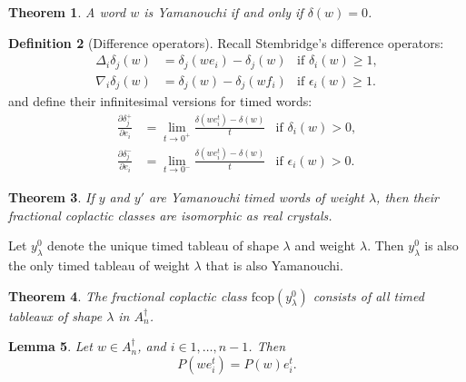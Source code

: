 \documentclass[12pt]{amsproc}
\newcommand{\fcop}{\mathrm{fcop}}
\newtheorem{theorem}{Theorem}
\newtheorem{lemma}[theorem]{Lemma}
\theoremstyle{definition}
\newtheorem{definition}[theorem]{Definition}
\begin{document}
\begin{theorem}
  A word $w$ is Yamanouchi if and only if $\delta(w)=0$.
\end{theorem}
\begin{definition}
  [Difference operators]
  Recall Stembridge's difference operators:
  \begin{align*}
    \Delta_i\delta_j(w) & = \delta_j(we_i)-\delta_j(w) & \text{if } \delta_i(w)\geq 1,\\
    \nabla_i\delta_j(w) & = \delta_j(w)-\delta_j(wf_i) & \text{if } \epsilon_i(w)\geq 1.
  \end{align*}
  and define their infinitesimal versions for timed words:
  \begin{align*}
    \frac{\partial\delta_j^+}{\partial e_i} &= \lim_{t\to 0^+}\frac{\delta(we_i^t)-\delta(w)}t & \text{if } \delta_i(w)>0,\\
    \frac{\partial\delta_j^-}{\partial e_i} &= \lim_{t\to 0^-}\frac{\delta(we_i^t)-\delta(w)}t & \text{if } \epsilon_i(w)>0.
  \end{align*}
\end{definition}
\begin{theorem}
  If $y$ and $y'$ are Yamanouchi timed words of weight $\lambda$, then their fractional coplactic classes are isomorphic as real crystals.
\end{theorem}
Let $y^0_\lambda$ denote the unique timed tableau of shape $\lambda$ and weight $\lambda$.
Then $y^0_\lambda$ is also the only timed tableau of weight $\lambda$ that is also Yamanouchi.
\begin{theorem}
  The fractional coplactic class $\fcop(y^0_\lambda)$ consists of all timed tableaux of shape $\lambda$ in $A_n^\dagger$.
\end{theorem}
\begin{lemma}
  Let $w\in A_n^\dagger$, and $i\in 1,\dotsc, n-1$.
  Then
  \begin{displaymath}
    P(w e_i^t) = P(w) e_i^t.
  \end{displaymath}
\end{lemma}
\end{document}
